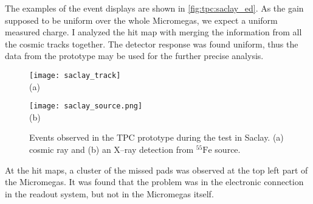 \documentclass[../main.tex]{subfiles}
\begin{document}
The examples of the event displays are shown in \autoref{fig:tpc:saclay_ed}. As the gain supposed to be uniform over the whole Micromegas, we expect a uniform measured charge. I analyzed the hit map with merging the information from all the cosmic tracks together. The detector response was found uniform, thus the data from the prototype may be used for the further precise analysis.

\begin{figure}[!ht]
  \centering
  \begin{minipage}{0.49\linewidth}
  \centering
    \texttt{[image: saclay\_track]} \\ (a)
  \end{minipage}
  \begin{minipage}{0.49\linewidth}
  \centering
    \texttt{[image: saclay\_source.png]} \\ (b)
  \end{minipage}
  \caption{Events observed in the TPC prototype during the test in Saclay. (a) cosmic ray and (b) an X--ray detection from ${}^{55}\text{Fe}$ source.}
  \label{fig:tpc:saclay_ed}
\end{figure}


At the hit maps, a cluster of the missed pads was observed at the top left part of the Micromegas. It was found that the problem was in the electronic connection in the readout system, but not in the Micromegas itself.
\end{document}
